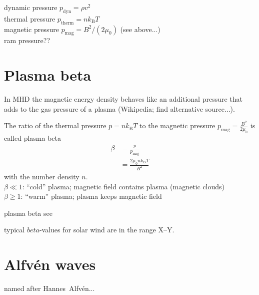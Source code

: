 dynamic pressure $p_\text{dyn} = \rho v^2$\\
thermal pressure $p_\text{therm} = n k_\text{B} T$\\
magnetic pressure $p_\text{mag} = B^2 / (2 \mu_0)$ (see above...)\\
ram pressure??\\


\section{Plasma beta}	%
In MHD the magnetic energy density behaves like an additional pressure that adds to the gas pressure of a plasma (Wikipedia; find alternative source...).

The ratio of the thermal pressure $p = n k_\text{B} T$ to the magnetic pressure $p_\text{mag} = \frac{B^2}{2 \mu_0}$ is called plasma beta
\begin{align}
	\beta &= \frac{p}{p_\text{mag}}\\
	&= \frac{2 \mu_0 n k_\text{B} T}{B^2}
\end{align}
with the number density $n$.\\
$\beta \ll 1$: ``cold'' plasma; magnetic field contains plasma (magnetic clouds)\\
$\beta \geq 1$: ``warm'' plasma; plasma keeps magnetic field

plasma beta see \citep[p.~50]{Kivelson1995}

typical $beta$-values for solar wind are in the range X--Y.\\



\section{Alfvén waves}	%
\label{sec:alfvén_waves}

named after Hannes~Alfvén...

